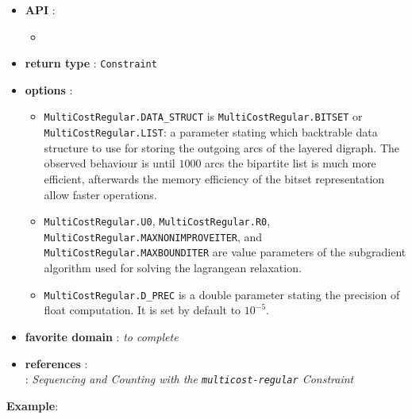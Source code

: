 \begin{itemize}
	\item \textbf{API} :
	\begin{itemize}
		\item {}
	\end{itemize}
	\item \textbf{return type} : \texttt{Constraint}
	\item \textbf{options} :
      \begin{itemize}
      \item \texttt{MultiCostRegular.DATA\_STRUCT} is  \texttt{MultiCostRegular.BITSET} or \texttt{MultiCostRegular.LIST}: a parameter stating which backtrable data structure to use for storing the outgoing arcs of the layered digraph. The observed behaviour is until $1000$ arcs the bipartite list is much more efficient, afterwards the memory efficiency of the bitset representation allow faster operations. 
      \item \texttt{MultiCostRegular.U0}, \texttt{MultiCostRegular.R0}, \texttt{MultiCostRegular.MAXNONIMPROVEITER}, and \texttt{MultiCostRegular.MAXBOUNDITER} are value parameters of the subgradient algorithm used for solving the lagrangean relaxation.
      \item \texttt{MultiCostRegular.D\_PREC} is a double parameter stating the precision of float computation. It is set by default to $10^{-5}$.
      \end{itemize}
	\item \textbf{favorite domain} : \emph{to complete}
	\item \textbf{references} :\\
       \cite{MenanaCPAIOR09}: \emph{Sequencing and Counting with the {\tt multicost-regular} Constraint}
\end{itemize}
\textbf{Example}:
